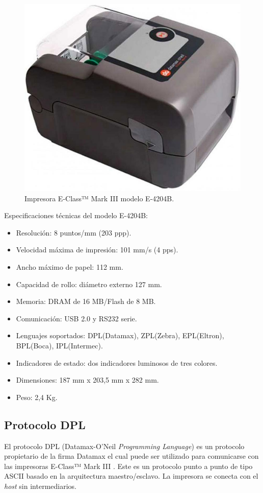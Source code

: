 \begin{figure}[htpb]
	\centering
	\includegraphics[scale=0.3]{./Figures/printer.jpeg}
	\caption{Impresora E-Class™ Mark III modelo E-4204B.}
	\label{fig:printer}
\end{figure}


Especificaciones técnicas del modelo E-4204B:
\begin{itemize}
\item Resolución: 8 puntos/mm (203 ppp).
\item Velocidad máxima de impresión: 101 mm/s (4 pps).
\item Ancho máximo de papel: 112 mm.
\item Capacidad de rollo: diámetro externo 127 mm.
\item Memoria: DRAM de 16 MB/Flash de 8 MB.
\item Comunicación: USB 2.0 y RS232 serie.
\item Lenguajes soportados: DPL(Datamax), ZPL(Zebra), EPL(Eltron), BPL(Boca), IPL(Intermec).
\item Indicadores de estado: dos indicadores luminosos de tres colores.
\item Dimensiones: 187 mm x 203,5 mm x 282 mm.
\item Peso: 2,4 Kg.
\end{itemize}

\subsection{Protocolo DPL}
\label{subsec:ProDPL}
El protocolo DPL (Datamax-O’Neil \textit{Programming Language}) es un protocolo propietario de la firma Datamax el cual puede ser utilizado para comunicarse con las impresoras E-Class™ Mark III \citep{DPL_man}. Este es un protocolo punto a punto de tipo ASCII basado en la arquitectura maestro/esclavo. La impresora se conecta con el \textit{host} sin intermediarios.

